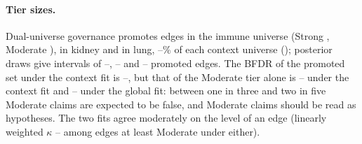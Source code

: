 \paragraph{Tier sizes.}
Dual-universe governance promotes \nGovPromImm{} edges in the immune universe (Strong \nGovStrongImm{}, Moderate \nGovModImm{}), \nGovPromKid{} in kidney and \nGovPromLung{} in lung, \nGovShareMin{}--\nGovShareMax{}\% of each context universe (); posterior draws give intervals of \nGovPromImmLo{}--\nGovPromImmHi{}, \nGovPromKidLo{}--\nGovPromKidHi{} and \nGovPromLungLo{}--\nGovPromLungHi{} promoted edges.
The BFDR of the promoted set under the context fit is \nGovBfdrPromMin{}--\nGovBfdrPromMax{}, but that of the Moderate tier alone is \nGovBfdrModMin{}--\nGovBfdrModMax{} under the context fit and \nGovBfdrModGlobMin{}--\nGovBfdrModGlobMax{} under the global fit: between one in three and two in five Moderate claims are expected to be false, and Moderate claims should be read as hypotheses.
The two fits agree moderately on the level of an edge (linearly weighted $\kappa$ \nGovKappaMin{}--\nGovKappaMax{} among edges at least Moderate under either).


